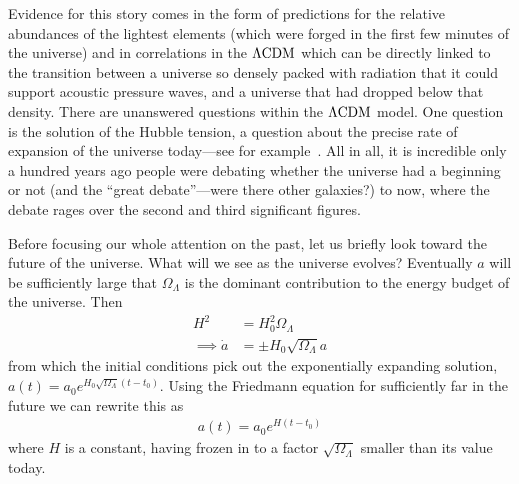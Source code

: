     Evidence for this story comes in the form of predictions for the relative abundances of the lightest
    elements (which were forged in the first few minutes of the universe) and in correlations in the $\Lambda\text{CDM}$
    which can be directly linked to the transition between a universe
    so densely packed with radiation that it could
    support acoustic pressure waves, and a universe that had dropped below that density.
    There are unanswered questions within the $\Lambda\text{CDM}$ model.
    One question is the solution of the Hubble tension, a question about the
    precise rate of expansion of the universe today---see for example~\cite{tensions_2019, Freedman_2021}.
    All in all, it is incredible only a hundred years ago people were debating
    whether the universe had a beginning or not
    (and the ``great debate''---were there other galaxies?) to now, where the debate rages over the second and
    third significant figures.


    Before focusing our whole attention on the past, let us briefly
    look toward the future of the universe.
    What will we see as the universe evolves?
    Eventually $a$ will be
    sufficiently large that $\Omega_{\Lambda}$
    is the dominant contribution to the energy budget of the universe.
    Then
    \begin{align}
        H^2 &= H_0^2\Omega_{\Lambda}\\
        \implies \dot{a} &= \pm H_0\sqrt{\Omega_{\Lambda}}a
    \end{align}
    from which the initial conditions pick out the exponentially expanding solution,\\
    ${a(t)=a_0e^{H_0\sqrt{\Omega_{\Lambda}}\left(t-t_0\right)}}$. Using the Friedmann equation
    for sufficiently far in the future we can rewrite this as
    \begin{align}
        a(t)=a_0e^{H\left(t-t_0\right)}
    \end{align}
    where $H$ is a constant, having frozen in to a factor $\sqrt{\Omega_{\Lambda}}$ smaller than
    its value today.


